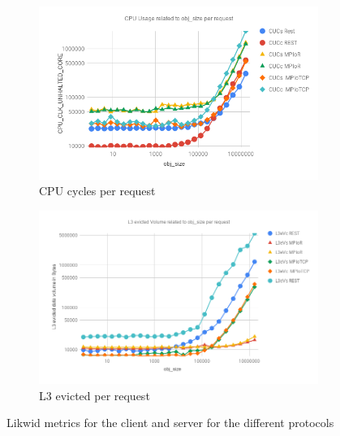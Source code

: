 \documentclass[runningheads]{llncs}
\begin{document}
\begin{figure}[!bt]
\centering
  \begin{subfigure}[t]{0.7\textwidth}
        \includegraphics[width=1\textwidth]{cpu-usage-rest-mpi.png}\vspace{-0.2em}
        \caption{CPU cycles per request}\vspace{-0.2em}
		\label{fig:cpu-usage-rest-mpi}
  \end{subfigure}
  \begin{subfigure}[t]{0.7\textwidth}
        \includegraphics[width=1\textwidth]{l3ev-rest-mpi.png}\vspace{-0.2em}
        \caption{L3 evicted per request}\vspace{-0.2em}
		\label{fig:l3ev-rest-mpi}
  \end{subfigure}

\caption{Likwid metrics for the client and server for the different protocols}
\end{figure}
\end{document}
